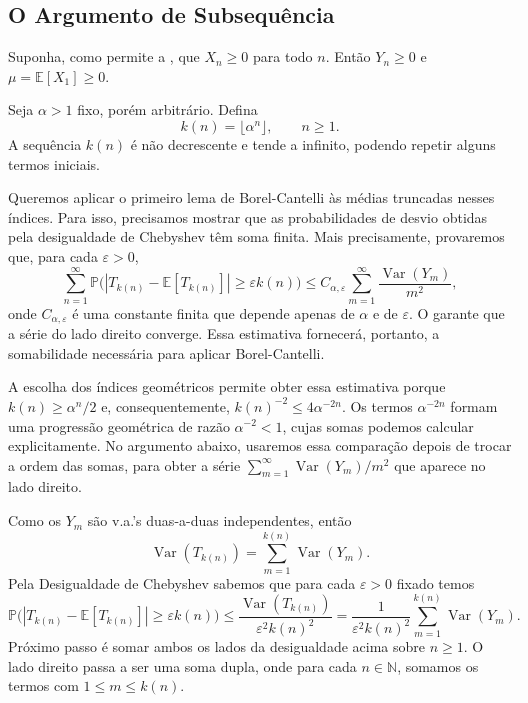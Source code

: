 \documentclass[12pt,portuguese]{article}
\theoremstyle{definition}
\theoremstyle{plainexercise}
\theoremstyle{starredexercise}
\theoremstyle{definition}
\begin{document}
\subsection{O Argumento de Subsequência}\label{subsec:subsequencia}

Suponha, como permite a , que $X_n\geqslant0$ para todo
$n$. Então $Y_n\geqslant0$ e $\mu=\mathbb{E}[X_1]\geqslant0$.

Seja $\alpha>1$ fixo, porém arbitrário. Defina
\begin{equation}\label{eq:kn}
k(n)=\lfloor\alpha^n\rfloor,
\qquad n\geqslant1.
\end{equation}
A sequência $k(n)$ é não decrescente e tende a infinito, podendo repetir
alguns termos iniciais.

Queremos aplicar o primeiro lema de Borel-Cantelli às médias truncadas nesses
índices. Para isso, precisamos mostrar que as probabilidades de desvio
obtidas pela desigualdade de Chebyshev têm soma finita. Mais precisamente,
provaremos que, para cada $\varepsilon>0$,
\[
\sum_{n=1}^{\infty}
\mathbb{P}\bigl(|T_{k(n)}-\mathbb{E}[T_{k(n)}]|\geqslant\varepsilon k(n)\bigr)
\leqslant
C_{\alpha,\varepsilon}
\sum_{m=1}^{\infty}\frac{\operatorname{Var}(Y_m)}{m^2},
\]
onde $C_{\alpha,\varepsilon}$ é uma constante finita que depende apenas de
$\alpha$ e de $\varepsilon$. O  garante que a série do
lado direito converge. Essa estimativa fornecerá, portanto, a somabilidade
necessária para aplicar Borel-Cantelli.

A escolha dos índices geométricos permite obter essa estimativa porque
$k(n)\geqslant\alpha^n/2$ e, consequentemente,
$k(n)^{-2}\leqslant4\alpha^{-2n}$. Os termos $\alpha^{-2n}$ formam uma
progressão geométrica de razão $\alpha^{-2}<1$, cujas somas podemos calcular
explicitamente. No argumento abaixo, usaremos essa comparação depois de
trocar a ordem das somas, para obter a série
$\sum_{m=1}^{\infty}\operatorname{Var}(Y_m)/m^2$ que aparece no lado direito.


\bigskip


Como os $Y_m$ são v.a.'s duas-a-duas independentes, então
\[
\operatorname{Var}(T_{k(n)})
=
\sum_{m=1}^{k(n)}\operatorname{Var}(Y_m).
\]
Pela Desigualdade de Chebyshev sabemos que para cada $\varepsilon>0$ fixado temos
\[
\mathbb{P}\bigl(|T_{k(n)}-\mathbb{E}[T_{k(n)}]|\geqslant\varepsilon k(n)\bigr)
\leqslant
\frac{\operatorname{Var}(T_{k(n)})}{\varepsilon^2k(n)^2}
=
\frac{1}{\varepsilon^2 k(n)^2}\sum_{m=1}^{k(n)} \operatorname{Var}(Y_m).
\]
Próximo passo é somar ambos os lados da desigualdade acima sobre $n\geqslant1$. O lado direito
passa a ser uma soma dupla, onde para cada $n\in\mathbb{N}$, somamos os termos com
$1\leqslant m\leqslant k(n)$.
\end{document}
